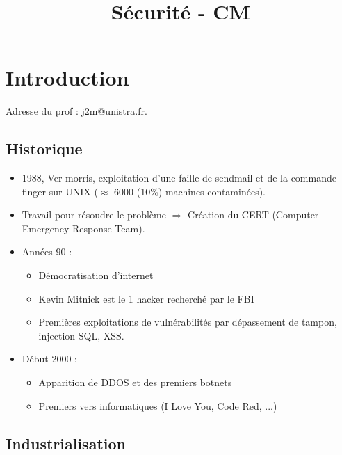 \documentclass[11pt,a4paper]{article}
\title{Sécurité - CM}
\begin{document}
	
	\maketitle
	
	\section{Introduction}
	
	Adresse du prof : j2m@unistra.fr.\\
	
	\subsection{Historique}
	
	\begin{itemize}
		\item 1988, Ver morris, exploitation d'une faille de sendmail et de la commande finger sur UNIX ($\approx $ 6000 (10\%) machines contaminées).
		\item Travail pour résoudre le problème $\Rightarrow$ Création du CERT (Computer Emergency Response Team).
		\item Années 90 :
		\begin{itemize}
			\item Démocratisation d'internet
			\item Kevin Mitnick est le 1\ier{} hacker recherché par le FBI
			\item Premières exploitations de vulnérabilités par dépassement de tampon, injection SQL, XSS.
		\end{itemize}
		\item Début 2000 :
		\begin{itemize}
			\item Apparition de DDOS et des premiers botnets
			\item Premiers vers informatiques (I Love You, Code Red, ...)
		\end{itemize}
	\end{itemize}
	
	\subsection{Industrialisation}
	
\end{document}
